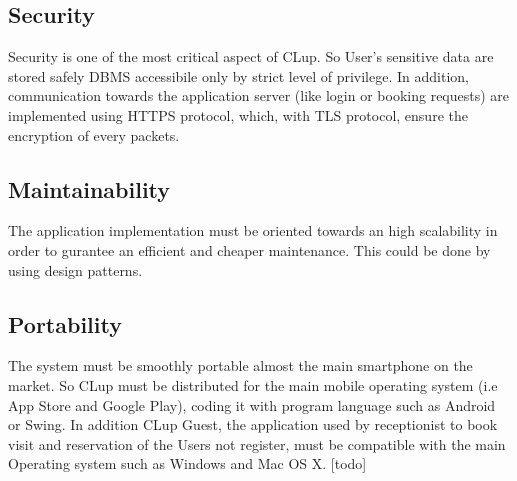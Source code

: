 \subsection{Security}
Security is one of the most critical aspect of CLup. So User's sensitive data are stored safely DBMS accessibile only by strict level of privilege. In addition, communication towards the application server (like login or booking requests) are implemented using  HTTPS protocol, which, with TLS protocol, ensure the encryption of every packets. 
\subsection{Maintainability}
The application implementation must be oriented towards an high scalability in order to gurantee an efficient and cheaper maintenance. This could be done by using design patterns.
\subsection{Portability}
The system must be smoothly portable almost the main smartphone on the market. So CLup must be distributed for the main mobile operating system (i.e App Store and Google Play), coding it with program language such as Android or Swing. In addition CLup Guest, the application used by receptionist to book visit and reservation of the Users not register, must be compatible with the main Operating system such as Windows and Mac OS X. [todo]